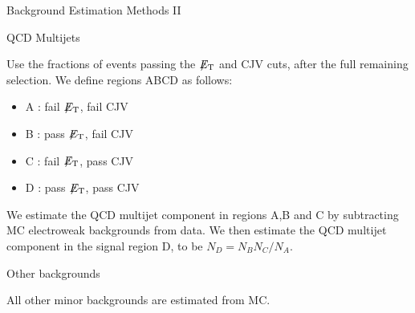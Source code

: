 \documentclass[8pt]{beamer}
\newcommand{\met}{\displaystyle{\not} E_{\rm T}}
\begin{document}
\begin{frame}{Background Estimation Methods II}

\begin{block}{QCD Multijets}

Use the fractions of events passing the $\met$ and CJV cuts, after the full remaining selection. We define regions ABCD as follows:

\begin{itemize}
 \item{A : fail $\met$, fail CJV}
 \item{B : pass $\met$, fail CJV}
 \item{C : fail $\met$, pass CJV}
 \item{D : pass $\met$, pass CJV}
\end{itemize}

We estimate the QCD multijet component in regions A,B and C by subtracting MC electroweak backgrounds from data. We then estimate the QCD multijet component in the signal region D, to be $N_{D} = N_{B}N_{C} / N_{A}$.

\end{block}

\begin{block}{Other backgrounds}
 
All other minor backgrounds are estimated from MC.
 
\end{block}
 
\end{frame}
\end{document}
